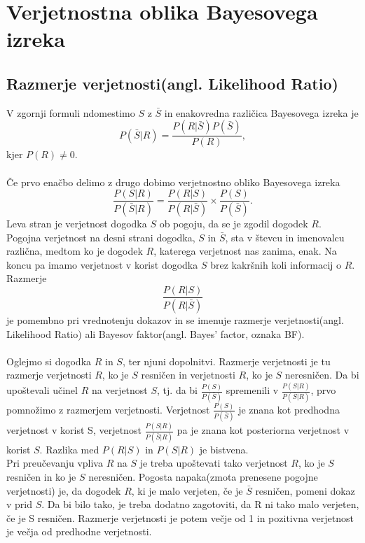 \documentclass[12pt,a4paper]{amsart}
\theoremstyle{definition} %
\theoremstyle{plain} %
\begin{document}
\section{Verjetnostna oblika Bayesovega izreka}
\subsection{Razmerje verjetnosti(angl. Likelihood Ratio)}
V zgornji formuli ndomestimo $S$ z $\bar{S}$ in enakovredna različica Bayesovega izreka je 
\[
    P(\bar{S} \lvert R) = \frac{P(R \lvert \bar{S})P(\bar{S})}{P(R)},
\]
kjer $P(R) \ne 0$.\\\\
Če prvo enačbo delimo z drugo dobimo verjetnostno obliko Bayesovega izreka
\[
    \frac{P(S \lvert R)}{P(\bar{S} \lvert R)} = \frac{P(R \lvert S)}{P(R \lvert \bar{S})} \times \frac{P(S)}{P(\bar{S})}.
\]
Leva stran je verjetnost dogodka $S$ ob pogoju, da se je zgodil dogodek $R$. Pogojna verjetnost na desni strani dogodka, $S$ in $\bar{S}$, sta v števcu in imenovalcu različna, 
medtom ko je dogodek $R$, katerega verjetnost nas zanima, enak. Na koncu pa imamo verjetnost v korist dogodka $S$ brez kakršnih koli informacij o $R$.\\
Razmerje 
\[\frac{P(R \lvert S)}{P(R \lvert \bar{S})}\]
je pomembno pri vrednotenju dokazov in se imenuje razmerje verjetnosti(angl. Likelihood Ratio) ali Bayesov faktor(angl. Bayes' factor, oznaka BF).\\\\
Oglejmo si dogodka $R$ in $S$, ter njuni dopolnitvi. Razmerje verjetnosti je tu razmerje verjetnosti $R$, ko je $S$ resničen in verjetnosti $R$, ko je $S$ neresničen. Da bi upoštevali učinel 
$R$ na verjetnost $S$, tj. da bi $\frac{P(S)}{P(\bar{S})}$ spremenili v $\frac{P(S \lvert R)}{P(\bar{S} \lvert R)}$, prvo pomnožimo z razmerjem verjetnosti. Verjetnost $\frac{P(S)}{P(\bar{S})}$ 
je znana kot predhodna verjetnost v korist S, verjetnost $\frac{P(S \lvert R)}{P(\bar{S} \lvert R)}$ pa je znana kot posteriorna verjetnost v korist $S$. Razlika med $P(R \lvert S)$ in $P(S \lvert R)$ je bistvena.\\
Pri preučevanju vpliva $R$ na $S$ je treba upoštevati tako verjetnost $R$, ko je $S$ resničen in ko je $S$ neresničen. Pogosta napaka(zmota prenesene pogojne verjetnosti) je, da dogodek $R$, ki je malo verjeten, če je $\bar{S}$ resničen, pomeni 
dokaz v prid $S$. Da bi bilo tako, je treba dodatno zagotoviti, da R ni tako malo verjeten, če je S resničen. Razmerje verjetnosti je potem večje od 1 in pozitivna verjetnost je večja od predhodne verjetnosti.
\end{document}
